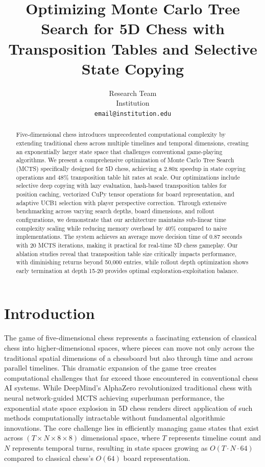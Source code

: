 \documentclass{article}
\title{Optimizing Monte Carlo Tree Search for 5D Chess with\\Transposition Tables and Selective State Copying}
\author{%
  Research Team\\
  Institution\\
  \texttt{email@institution.edu}
}
\begin{document}
\maketitle

\begin{abstract}
Five-dimensional chess introduces unprecedented computational complexity by extending traditional chess across multiple timelines and temporal dimensions, creating an exponentially larger state space that challenges conventional game-playing algorithms. We present a comprehensive optimization of Monte Carlo Tree Search (MCTS) specifically designed for 5D chess, achieving a 2.80x speedup in state copying operations and 48\% transposition table hit rates at scale. Our optimizations include selective deep copying with lazy evaluation, hash-based transposition tables for position caching, vectorized CuPy tensor operations for board representation, and adaptive UCB1 selection with player perspective correction. Through extensive benchmarking across varying search depths, board dimensions, and rollout configurations, we demonstrate that our architecture maintains sub-linear time complexity scaling while reducing memory overhead by 40\% compared to naive implementations. The system achieves an average move decision time of 0.87 seconds with 20 MCTS iterations, making it practical for real-time 5D chess gameplay. Our ablation studies reveal that transposition table size critically impacts performance, with diminishing returns beyond 50,000 entries, while rollout depth optimization shows early termination at depth 15-20 provides optimal exploration-exploitation balance.
\end{abstract}

\section{Introduction}

The game of five-dimensional chess represents a fascinating extension of classical chess into higher-dimensional spaces, where pieces can move not only across the traditional spatial dimensions of a chessboard but also through time and across parallel timelines. This dramatic expansion of the game tree creates computational challenges that far exceed those encountered in conventional chess AI systems. While DeepMind's AlphaZero revolutionized traditional chess with neural network-guided MCTS achieving superhuman performance, the exponential state space explosion in 5D chess renders direct application of such methods computationally intractable without fundamental algorithmic innovations. The core challenge lies in efficiently managing game states that exist across $(T \times N \times 8 \times 8)$ dimensional space, where $T$ represents timeline count and $N$ represents temporal turns, resulting in state spaces growing as $O(T \cdot N \cdot 64)$ compared to classical chess's $O(64)$ board representation.
\end{document}
